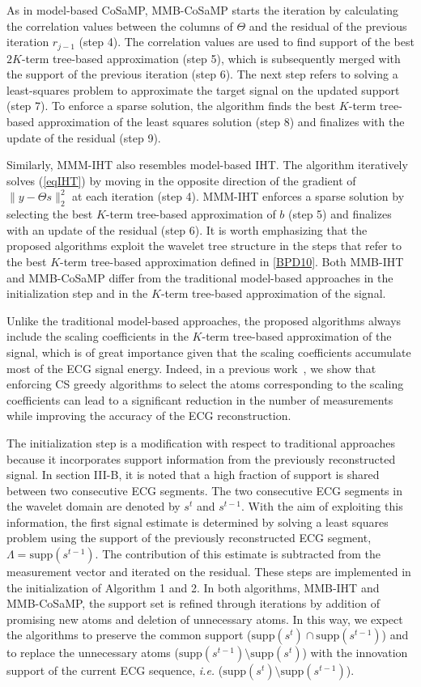 \documentclass[journal]{IEEEtran}
\begin{document}
As in model-based CoSaMP, MMB-CoSaMP starts the iteration by calculating the correlation values between the columns of $\Theta$ and the residual of the previous iteration $r_{j-1}$ (step 4).  The correlation values are used to find support of the best $2K$-term tree-based approximation (step 5), which is  subsequently merged with the support of the previous iteration (step 6). The next step refers to solving a least-squares problem to approximate the target signal on the updated support (step 7). To enforce a sparse solution, the algorithm finds the best $K$-term tree-based approximation of the least squares solution (step 8) and finalizes with the update of the residual (step 9).

Similarly, MMM-IHT also resembles model-based IHT. The algorithm iteratively solves (\ref{eqIHT}) by moving in the opposite direction of the gradient of $\|y-\Theta s\|_{2}^{2}$ at each iteration (step 4). MMM-IHT enforces a sparse solution by selecting the best $K$-term tree-based approximation of $b$ (step 5) and finalizes with an update of the residual (step 6). It is worth emphasizing that the proposed algorithms exploit the wavelet tree structure in the steps that refer to the best $K$-term tree-based approximation defined in \eqref{BPD10}. Both MMB-IHT and MMB-CoSaMP differ from the traditional model-based approaches in the initialization step and in the $K$-term tree-based approximation of the signal.

Unlike the traditional model-based approaches, the proposed algorithms always include the scaling coefficients in the $K$-term tree-based approximation of the signal, which is of great importance given that the scaling coefficients accumulate most of the ECG signal energy. Indeed, in a previous work~\cite{Carr10}, we show that enforcing CS greedy algorithms to select the atoms corresponding to the scaling coefficients can lead to a significant reduction in the number of measurements while improving the accuracy of the ECG reconstruction.

The initialization step is a modification with respect to traditional approaches because it incorporates support information from the previously reconstructed signal. In section III-B, it is noted that a high fraction of support is shared between two consecutive ECG segments. The two consecutive ECG segments in the wavelet domain are denoted by $s^t$ and $s^{t-1}$. With the aim of exploiting this information, the first signal estimate is determined by solving a least squares problem using the support of the previously reconstructed ECG segment, $\Lambda=\text{supp}(s^{t-1})$. The contribution of this estimate is subtracted from the measurement vector and iterated on the residual. These steps are implemented in the initialization of Algorithm 1 and 2. In both algorithms, MMB-IHT and MMB-CoSaMP, the support set is refined through iterations by addition of promising new atoms and deletion of unnecessary atoms. In this way, we expect the algorithms to preserve the common support ($\text{supp}(s^{t}) \cap \text{supp}(s^{t-1})$) and to replace the unnecessary atoms ($\text{supp}(s^{t-1})\setminus\text{supp}(s^{t})$) with the innovation support of the current ECG sequence, \textit{i.e.} ($\text{supp}(s^{t})\setminus\text{supp}(s^{t-1})$).
\end{document}
